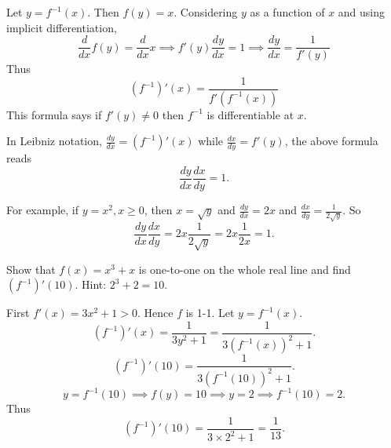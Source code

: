 \documentclass[../main.tex]{subfiles}
\begin{document}
Let $y = f^{-1}(x)$. Then $f(y)=x$. Considering $y$ as a function of $x$ and using implicit differentiation,
\[
  \frac{d}{dx} f(y) = \frac{d}{dx} x \implies f'(y) \frac{dy}{dx} = 1 \implies \frac{dy}{dx} = \frac{1}{f'(y)}
\]
Thus
\[
  (f^{-1})'(x) = \frac{1}{f'(f^{-1}(x))}
\]
This formula says if $f'(y) \neq 0$ then $f^{-1}$ is differentiable at $x$.

In Leibniz notation, $\frac{dy}{dx} = (f^{-1})'(x)$ while $\frac{dx}{dy} = f'(y)$, the above formula reads
\[
  \frac{dy}{dx} \frac{dx}{dy} = 1.
\]

For example, if $y=x^2, x\ge 0$, then $x=\sqrt{y}$ and $\frac{dy}{dx} = 2x$ and $\frac{dx}{dy} = \frac{1}{2\sqrt{y}}$. So
\[
  \frac{dy}{dx} \frac{dx}{dy} = 2x \frac{1}{2\sqrt{y}} = 2x \frac{1}{2x} = 1.
\]
\begin{example}
  Show that $f(x) = x^3 + x$ is one-to-one on the whole real line and find $(f^{-1})'(10)$. Hint: $2^3 + 2 = 10$.
\end{example}
\begin{solution}
  First $f'(x) = 3x^2 + 1 >0$. Hence $f$ is 1-1.
  Let $y = f^{-1}(x)$.
  \[
    (f^{-1})'(x) = \frac{1}{3 y^2 + 1} = \frac{1}{3 (f^{-1}(x))^2 + 1}.
  \]
  \[
    (f^{-1})'(10) = \frac{1}{3 (f^{-1}(10))^2 + 1}.
  \]
  \[
    y = f^{-1}(10) \implies f(y) = 10 \implies y = 2 \implies f^{-1}(10) = 2.
  \]
  Thus
  \[
    (f^{-1})'(10) = \frac{1}{3\times2^2 + 1} = \frac{1}{13}.
  \]
\end{solution}

\end{document}
